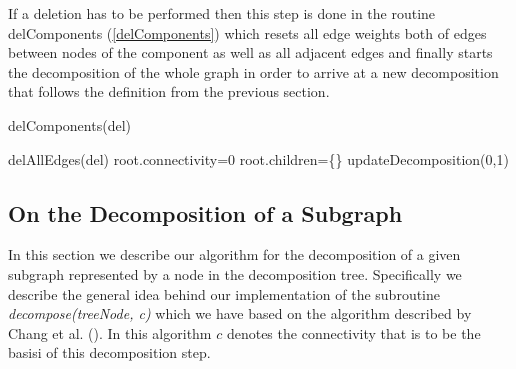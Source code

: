 \documentclass[a4paper,xcolor=dvipsnames, tikz, 12pt]{article}
\theoremstyle{definition}
\begin{document}
If a deletion has to be performed then this step is done in the routine delComponents (\cref{delComponents}) which resets all edge weights both of edges between nodes of the component as well as all adjacent edges and finally starts the decomposition of the whole graph in order to arrive at a new decomposition that follows the definition from the previous section.



\begin{algorithm}
	\caption{delComponents(del)}
	\label{delComponents}
	\begin{algorithmic}
		\STATE delAllEdges(del)
		\STATE root.connectivity=0
		\STATE root.children=\{\}
		\STATE updateDecomposition(0,1)
	\end{algorithmic}
\end{algorithm}


\begin{comment}
\begin{itemize}
	\item \cref{insertAndUpdate} calls the other routines as needed
	\item \cref{updateDecomposition} starts at the smallest subgraph containing the nodes a and b in the decomposition tree and computes a new decomposition of the subgraph. Specifically it uses the decomposition approach from \cite{Chang2013} to decompose one subgraph and then also computes the subgraphs with the next higher connectivity and recurses until the connectivity has reached alpha.
	\item updateMapping checks whether the alphaConnectedComponents were changed. If yes then it either collocates them if the resulting component is small enough or it adds the component to its return value. Then all the returned components are deleted, i.e. the edges connecting its nodes are deleted and the decomposition is recomputed
	\item this deletion is performed by \cref{delComponents}
\end{itemize}
\end{comment}

\subsection{On the Decomposition of a Subgraph}
\label{decomp_desc}
In this section we describe our algorithm for the decomposition of a given subgraph represented by a node in the decomposition tree. Specifically we describe the general idea behind our implementation of the subroutine \textit{decompose(treeNode, c)} which we have based on the algorithm described by Chang et al. (\cite{Chang2013}). In this algorithm $c$ denotes the connectivity that is to be the basisi of this decomposition step.
\end{document}
